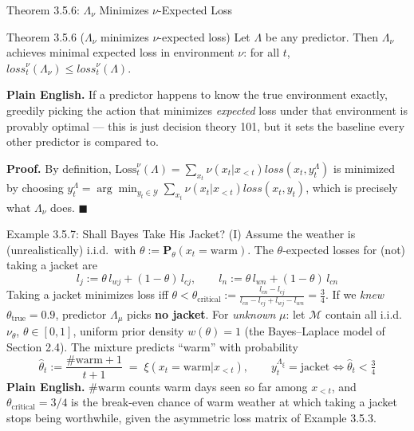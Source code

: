 \documentclass[aspectratio=169,10pt]{beamer}
\newcommand{\Mcal}{\mathcal{M}}
\newcommand{\Loss}{\mathrm{Loss}}
\newcommand{\loss}{\mathit{loss}}
\begin{document}
\begin{frame}{Theorem 3.5.6: $\Lambda_\nu$ Minimizes $\nu$-Expected Loss}
  \begin{block}{Theorem 3.5.6 ($\Lambda_\nu$ minimizes $\nu$-expected loss)}
    Let $\Lambda$ be any predictor. Then $\Lambda_\nu$ achieves minimal
    expected loss in environment $\nu$: for all $t$,
    $\loss_t^\nu(\Lambda_\nu) \le \loss_t^\nu(\Lambda)$.
  \end{block}
  \textbf{Plain English.} If a predictor happens to know the true environment
  exactly, greedily picking the action that minimizes \emph{expected} loss
  under that environment is provably optimal --- this is just decision
  theory 101, but it sets the baseline every other predictor is compared to.

  \vspace{2mm}
  \textbf{Proof.} By definition,
  $\Loss_t^\nu(\Lambda)=\sum_{x_t}\nu(x_t|x_{<t})\loss(x_t,y_t^\Lambda)$ is
  minimized by choosing
  $y_t^\Lambda = \arg\min_{y_t\in\mathcal{Y}}\sum_{x_t}\nu(x_t|x_{<t})\loss(x_t,y_t)$,
  which is precisely what $\Lambda_\nu$ does. $\blacksquare$
\end{frame}

\begin{frame}{Example 3.5.7: Shall Bayes Take His Jacket? (I)}
  Assume the weather is (unrealistically) i.i.d.\ with
  $\theta := \mathbf{P}_\theta(x_t=\text{warm})$. The $\theta$-expected losses
  for (not) taking a jacket are
  \[
    l_j := \theta\,l_{wj}+(1-\theta)\,l_{cj}, \qquad l_n := \theta\,l_{wn}+(1-\theta)\,l_{cn}
  \]
  Taking a jacket minimizes loss iff $\theta < \theta_{\text{critical}} :=
  \frac{l_{cn}-l_{cj}}{l_{cn}-l_{cj}+l_{wj}-l_{wn}} = \frac34$.
  If we \emph{knew} $\theta_{\text{true}}=0.9$, predictor $\Lambda_\mu$ picks
  \textbf{no jacket}. For \emph{unknown} $\mu$: let $\Mcal$ contain all i.i.d.\
  $\nu_\theta$, $\theta\in[0,1]$, uniform prior density $w(\theta)=1$ (the
  Bayes--Laplace model of Section 2.4). The mixture predicts ``warm'' with
  probability
  \[
    \hat\theta_t := \frac{\#\text{warm}+1}{t+1} \; = \; \xi(x_t=\text{warm}|x_{<t}),
    \qquad y_t^{\Lambda_\xi}=\text{jacket} \iff \hat\theta_t < \tfrac34
  \]
  \textbf{Plain English.} $\#\text{warm}$ counts warm days seen so far among
  $x_{<t}$, and $\theta_{\text{critical}}=3/4$ is the break-even chance of
  warm weather at which taking a jacket stops being worthwhile, given the
  asymmetric loss matrix of Example 3.5.3.
\end{frame}
\end{document}
